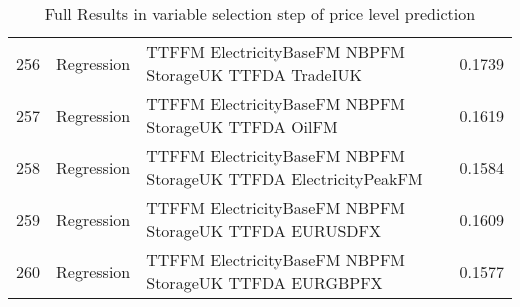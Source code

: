 \begin{table}[ht]
\begin{tabular}{rllr}
  256 & Regression & TTFFM ElectricityBaseFM NBPFM StorageUK TTFDA TradeIUK & 0.1739 \\ 
  257 & Regression & TTFFM ElectricityBaseFM NBPFM StorageUK TTFDA OilFM & 0.1619 \\ 
  258 & Regression & TTFFM ElectricityBaseFM NBPFM StorageUK TTFDA ElectricityPeakFM & 0.1584 \\ 
  259 & Regression & TTFFM ElectricityBaseFM NBPFM StorageUK TTFDA EURUSDFX & 0.1609 \\ 
  260 & Regression & TTFFM ElectricityBaseFM NBPFM StorageUK TTFDA EURGBPFX & 0.1577 \\ 
   \hline
\end{tabular}
\caption{Full Results in variable selection step of price level prediction} 
\label{tab:level.var.selection.full}
\end{table}
